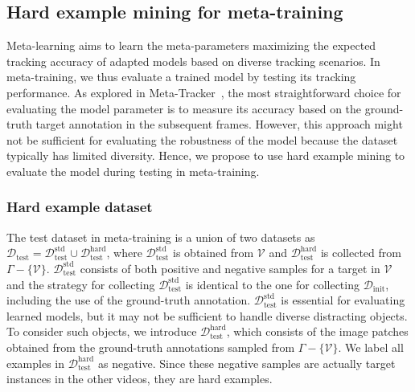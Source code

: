 \documentclass[letterpaper]{article} %
\def \datainit{\mathcal{D}_\text{init}}
\def \dataval{\mathcal{D}_\text{test}}
\begin{document}

\subsection{Hard example mining for meta-training}

Meta-learning aims to learn the meta-parameters maximizing the expected tracking accuracy of adapted models based on diverse tracking scenarios.
In meta-training, we thus evaluate a trained model by testing its tracking performance. %
As explored in Meta-Tracker~\cite{park2018metatracker}, the most straightforward choice for evaluating the model parameter is to measure its accuracy based on the ground-truth target annotation in the subsequent frames.
However, this approach might not be sufficient for evaluating the robustness of the model because the dataset typically has limited diversity.
Hence, we propose to use hard example mining to evaluate the model during testing in meta-training.

\subsubsection{Hard example dataset}

The test dataset in meta-training is a union of two datasets as $\dataval=\dataval^\text{std}\cup\dataval^\text{hard}$, where $\dataval^\text{std}$ is obtained from $\mathcal{V}$ and $\dataval^\text{hard}$ is collected from $\Gamma-\{\mathcal{V}\}$.
$\dataval^\text{std}$ consists of both positive and negative samples for a target in $\mathcal{V}$ and the strategy for collecting $\dataval^\text{std}$ is identical to the one for collecting $\datainit$, including the use of the ground-truth annotation.
$\dataval^\text{std}$ is essential for evaluating learned models, but it may not be sufficient to handle diverse distracting objects.
To consider such objects, we introduce $\dataval^\text{hard}$, which consists of the image patches obtained from the ground-truth annotations sampled from $\Gamma-\{\mathcal{V}\}$.
We label all examples in $\dataval^\text{hard}$ as negative.
Since these negative samples are actually target instances in the other videos, they are hard examples.
\end{document}
